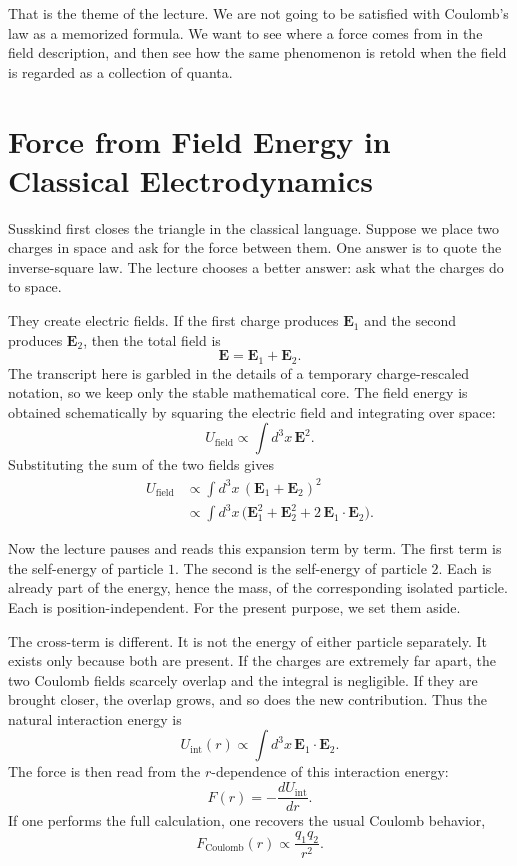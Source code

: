 That is the theme of the lecture. We are not going to be satisfied with Coulomb's law as a memorized formula. We want to see where a force comes from in the field description, and then see how the same phenomenon is retold when the field is regarded as a collection of quanta.

\section{Force from Field Energy in Classical Electrodynamics}

Susskind first closes the triangle in the classical language. Suppose we place two charges in space and ask for the force between them. One answer is to quote the inverse-square law. The lecture chooses a better answer: ask what the charges do to space.

They create electric fields. If the first charge produces \(\mathbf{E}_1\) and the second produces \(\mathbf{E}_2\), then the total field is
\begin{equation}
\mathbf{E}=\mathbf{E}_1+\mathbf{E}_2.
\end{equation}
The transcript here is garbled in the details of a temporary charge-rescaled notation, so we keep only the stable mathematical core. The field energy is obtained schematically by squaring the electric field and integrating over space:
\begin{equation}
U_{\text{field}}\propto \int d^3x\,\mathbf{E}^2.
\end{equation}
Substituting the sum of the two fields gives
\begin{align}
U_{\text{field}}
&\propto \int d^3x\,(\mathbf{E}_1+\mathbf{E}_2)^2 \\
&\propto \int d^3x\,\bigl(\mathbf{E}_1^2+\mathbf{E}_2^2+2\,\mathbf{E}_1\!\cdot\!\mathbf{E}_2\bigr).
\end{align}

Now the lecture pauses and reads this expansion term by term. The first term is the self-energy of particle \(1\). The second is the self-energy of particle \(2\). Each is already part of the energy, hence the mass, of the corresponding isolated particle. Each is position-independent. For the present purpose, we set them aside.

The cross-term is different. It is not the energy of either particle separately. It exists only because both are present. If the charges are extremely far apart, the two Coulomb fields scarcely overlap and the integral is negligible. If they are brought closer, the overlap grows, and so does the new contribution. Thus the natural interaction energy is
\begin{equation}
U_{\text{int}}(r)\propto \int d^3x\,\mathbf{E}_1\!\cdot\!\mathbf{E}_2.
\end{equation}
The force is then read from the \(r\)-dependence of this interaction energy:
\begin{equation}
F(r)=-\frac{dU_{\text{int}}}{dr}.
\end{equation}
If one performs the full calculation, one recovers the usual Coulomb behavior,
\begin{equation}
F_{\text{Coulomb}}(r)\propto \frac{q_1q_2}{r^2}.
\end{equation}

